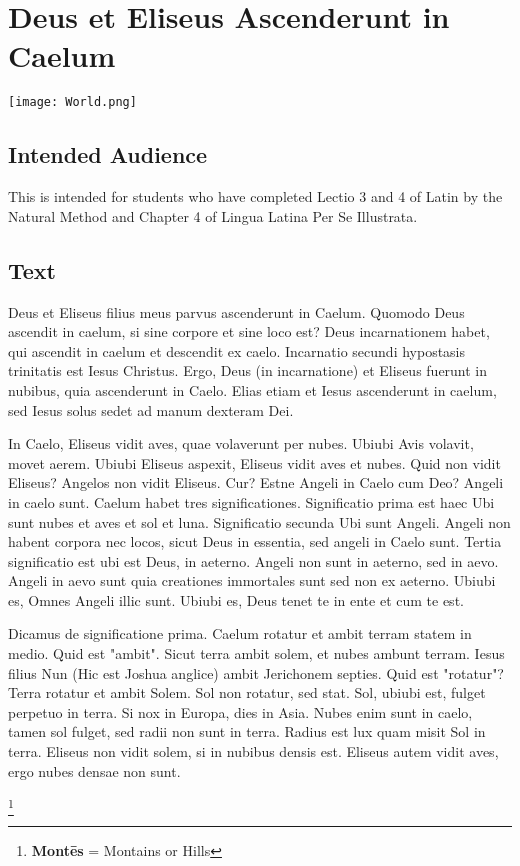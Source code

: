 \chapter{Deus et Eliseus Ascenderunt in Caelum}
\begin{center}
\texttt{[image: World.png]}
\end{center}

\section{Intended Audience}
This is intended for students who have completed Lectio 3 and 4 of Latin by the Natural Method and Chapter 4 of Lingua Latina Per Se Illustrata. 

\section{Text}
Deus et Eliseus filius meus parvus ascenderunt in Caelum. Quomodo Deus ascendit in caelum, si sine corpore et sine loco est? Deus incarnationem habet, qui ascendit in caelum et descendit ex caelo. Incarnatio secundi hypostasis trinitatis est Iesus Christus. Ergo, Deus (in incarnatione) et Eliseus fuerunt in nubibus, quia ascenderunt in Caelo. Elias etiam et Iesus ascenderunt in caelum, sed Iesus solus sedet ad manum dexteram Dei. 

In Caelo, Eliseus vidit aves, quae volaverunt per nubes. Ubiubi Avis volavit, movet aerem. Ubiubi Eliseus aspexit, Eliseus vidit aves et nubes. Quid non vidit Eliseus? Angelos non vidit Eliseus. Cur? Estne Angeli in Caelo cum Deo?  Angeli in caelo sunt. Caelum habet tres significationes. Significatio prima est haec \: Ubi sunt nubes et aves et sol et luna. Significatio secunda \: Ubi sunt Angeli. Angeli non habent corpora nec locos, sicut Deus in essentia, sed angeli in Caelo sunt. Tertia significatio est ubi est Deus, in aeterno. Angeli non sunt in aeterno, sed in aevo. Angeli in aevo sunt quia creationes immortales sunt sed non ex aeterno. Ubiubi es, Omnes Angeli illic sunt. Ubiubi es, Deus tenet te in ente et cum te est. 

Dicamus de significatione prima. Caelum rotatur et ambit terram statem in medio. Quid est "ambit". Sicut terra ambit solem, et nubes ambunt terram. Iesus filius Nun (Hic est Joshua anglice) ambit Jerichonem septies. Quid est "rotatur"? Terra rotatur et ambit Solem. Sol non rotatur, sed stat. Sol, ubiubi est, fulget perpetuo in terra. Si nox in Europa, dies in Asia. Nubes enim sunt in caelo, tamen sol fulget, sed radii non sunt in terra. Radius est lux quam misit Sol in terra. Eliseus non vidit solem, si in nubibus densis est. Eliseus autem vidit aves, ergo nubes densae non sunt. 


\footnote{\textbf{Montēs} = Montains or Hills}
